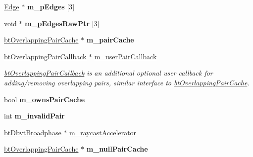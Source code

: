 \begin{DoxyCompactItemize}
\item 
\mbox{\label{classbtAxisSweep3Internal_a4f202cfa083a3ad4185384b7c7a10aa7}} 
\hyperlink{classbtAxisSweep3Internal_1_1Edge}{Edge} $\ast$ {\bfseries m\+\_\+p\+Edges} \mbox{[}3\mbox{]}
\item 
\mbox{\label{classbtAxisSweep3Internal_a3579ccb6d1dc85e5dbe6eada4a71d433}} 
void $\ast$ {\bfseries m\+\_\+p\+Edges\+Raw\+Ptr} \mbox{[}3\mbox{]}
\item 
\mbox{\label{classbtAxisSweep3Internal_a9e576084560e387d1f6b515643bce115}} 
\hyperlink{classbtOverlappingPairCache}{bt\+Overlapping\+Pair\+Cache} $\ast$ {\bfseries m\+\_\+pair\+Cache}
\item 
\mbox{\label{classbtAxisSweep3Internal_a56721c6695a40edd025c846f421a9dc7}} 
\hyperlink{classbtOverlappingPairCallback}{bt\+Overlapping\+Pair\+Callback} $\ast$ \hyperlink{classbtAxisSweep3Internal_a56721c6695a40edd025c846f421a9dc7}{m\+\_\+user\+Pair\+Callback}
\begin{DoxyCompactList}\small\item\em \hyperlink{classbtOverlappingPairCallback}{bt\+Overlapping\+Pair\+Callback} is an additional optional user callback for adding/removing overlapping pairs, similar interface to \hyperlink{classbtOverlappingPairCache}{bt\+Overlapping\+Pair\+Cache}. \end{DoxyCompactList}\item 
\mbox{\label{classbtAxisSweep3Internal_a4ae7463e32030034f503bd6f32835108}} 
bool {\bfseries m\+\_\+owns\+Pair\+Cache}
\item 
\mbox{\label{classbtAxisSweep3Internal_a6ecb6f04fd6ed4e84f99b0e934615537}} 
int {\bfseries m\+\_\+invalid\+Pair}
\item 
\hyperlink{structbtDbvtBroadphase}{bt\+Dbvt\+Broadphase} $\ast$ \hyperlink{classbtAxisSweep3Internal_a059cd72f13ef063c5bcaecb6e46930bc}{m\+\_\+raycast\+Accelerator}
\item 
\mbox{\label{classbtAxisSweep3Internal_aacfc8338c920f0f354b1180b3d2810c4}} 
\hyperlink{classbtOverlappingPairCache}{bt\+Overlapping\+Pair\+Cache} $\ast$ {\bfseries m\+\_\+null\+Pair\+Cache}
\end{DoxyCompactItemize}



